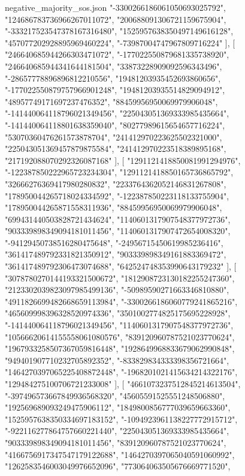 \begin{filecontents*}[overwrite]{negative_majority_sos.json}
    "-3300266186061050693025792",
    "124686783736966267011072",
    "200688091306721159675904",
    "-333217523547378167316480",
    "1525957638350497149616128",
    "457077202928895969460224",
    "-73987004747967809716224"
   ],
   [
    "246640685944266303471072",
    "-177022550879681335738920",
    "246640685944341644181504",
    "33873228909092596343496",
    "-28657778896896812210556",
    "19481203935452693860656",
    "-177022550879757966901248",
    "19481203935514829094912",
    "48957749171697237476352",
    "88459956950069979906048",
    "-141440064118796021349456",
    "225043051369333985435664",
    "-141440064118801638359040",
    "80277989615654657716224",
    "53070360476261573878704",
    "241412970223625502321000",
    "225043051369457879875584",
    "241412970223518389895168",
    "217192088070292326087168"
   ],
   [
    "1291121418850081991294976",
    "-122387850222965723234304",
    "1291121418850165736865792",
    "32666276369417980280832",
    "2233764362052146831267808",
    "178950044265718024334592",
    "-122387850223118133755904",
    "178950044265871558311936",
    "88459956950069979906048",
    "699431440503828721434624",
    "1140601317907548377972736",
    "903339898349094181011456",
    "1140601317907472654008320",
    "-94129450738516280475648",
    "-24956715450619985236416",
    "361417489792331821350912",
    "903339898349161883369472",
    "361417489792306473074688",
    "642524748353990643179232"
   ],
   [
    "3078780270144193321500672",
    "1812908723130182255247360",
    "2123302039823097985499136",
    "-50989590271663346810880",
    "4911826699482668659113984",
    "-3300266186060779241865216",
    "465609998396328520974336",
    "3501002774825175695228928",
    "-141440064118796021349456",
    "1140601317907548377972736",
    "10566620614155558061080576",
    "839120960787521023770624",
    "1967933258507367059816448",
    "1928649968833679062990848",
    "949401907710232705892352",
    "-833829834333398356721664",
    "1464270397065225408872448",
    "-1968201021415634214322176",
    "129484275100706721233008"
   ],
   [
    "4661073237512845214613504",
    "-397496573667849936568320",
    "45605591525551248506880",
    "192569689093249475906112",
    "1849800856777039659663360",
    "1525957638350334697183152",
    "-1094923961138227772915712",
    "-922116277864757660221440",
    "225043051369333985435664",
    "903339898349094181011456",
    "839120960787521023770624",
    "4166756917347547179122688",
    "1464270397065040591060992",
    "1262583546003049976652096",
    "773064063505676669771520",

\end{filecontents*}

